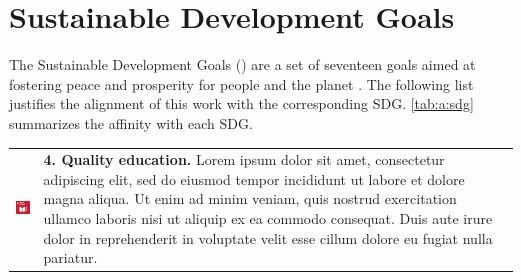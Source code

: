 % 
% 
% 





\chapter{Sustainable Development Goals}
\label{sec:a:sdg}

The Sustainable Development Goals () are a set of seventeen goals aimed at fostering peace and prosperity for people and the planet \cite{un-2030-agenda}.
The following list justifies the alignment of this work with the corresponding SDG. \autoref{tab:a:sdg} summarizes the affinity with each SDG.





\begingroup
    
    \setlength\tabcolsep{0pt}
    \renewcommand*{\arraystretch}{1}

    \noindent
    \begin{tabular}{p{25mm} p{125mm}}
        \vspace{0mm} \includegraphics[width=2cm]{text/appendix/appendix-sdg/resources/sdg4.pdf} & \vspace{-0.5mm} \textbf{4. Quality education.} %
        Lorem ipsum dolor sit amet, consectetur adipiscing elit, sed do eiusmod tempor incididunt ut labore et dolore magna aliqua. Ut enim ad minim veniam, quis nostrud exercitation ullamco laboris nisi ut aliquip ex ea commodo consequat. Duis aute irure dolor in reprehenderit in voluptate velit esse cillum dolore eu fugiat nulla pariatur. \\
    \end{tabular}

